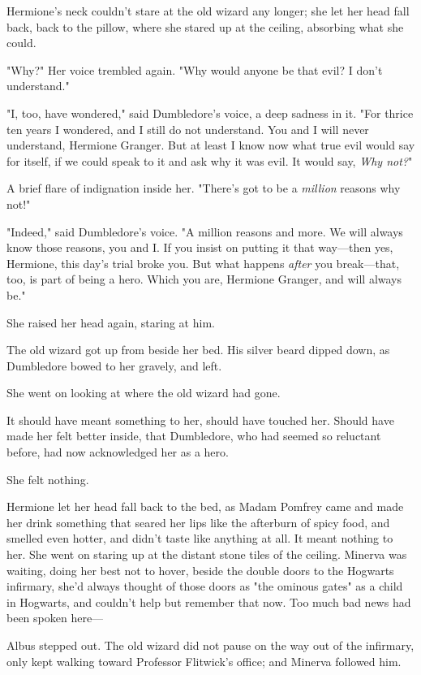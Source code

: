 Hermione's neck couldn't stare at the old wizard any longer; she let her head
fall back, back to the pillow, where she stared up at the ceiling, absorbing
what she could.

"Why?" Her voice trembled again. "Why would anyone be that evil? I don't
understand."

"I, too, have wondered," said Dumbledore's voice, a deep sadness in it. "For
thrice ten years I wondered, and I still do not understand. You and I will
never understand, Hermione Granger. But at least I know now what true evil
would say for itself, if we could speak to it and ask why it was evil. It would
say, \emph{Why not?}"

A brief flare of indignation inside her. "There's got to be a \emph{million}
reasons why not!"

"Indeed," said Dumbledore's voice. "A million reasons and more. We will always
know those reasons, you and I\@. If you insist on putting it that way---then yes,
Hermione, this day's trial broke you. But what happens \emph{after} you
break---that, too, is part of being a hero. Which you are, Hermione Granger,
and will always be."

She raised her head again, staring at him.

The old wizard got up from beside her bed. His silver beard dipped down, as
Dumbledore bowed to her gravely, and left.

She went on looking at where the old wizard had gone.

It should have meant something to her, should have touched her. Should have
made her felt better inside, that Dumbledore, who had seemed so reluctant
before, had now acknowledged her as a hero.

She felt nothing.

Hermione let her head fall back to the bed, as Madam Pomfrey came and made her
drink something that seared her lips like the afterburn of spicy food, and
smelled even hotter, and didn't taste like anything at all. It meant nothing to
her. She went on staring up at the distant stone tiles of the ceiling.
\later
Minerva was waiting, doing her best not to hover, beside the double doors to
the Hogwarts infirmary, she'd always thought of those doors as "the ominous
gates" as a child in Hogwarts, and couldn't help but remember that now. Too
much bad news had been spoken here---

Albus stepped out. The old wizard did not pause on the way out of the
infirmary, only kept walking toward Professor Flitwick's office; and Minerva
followed him.

